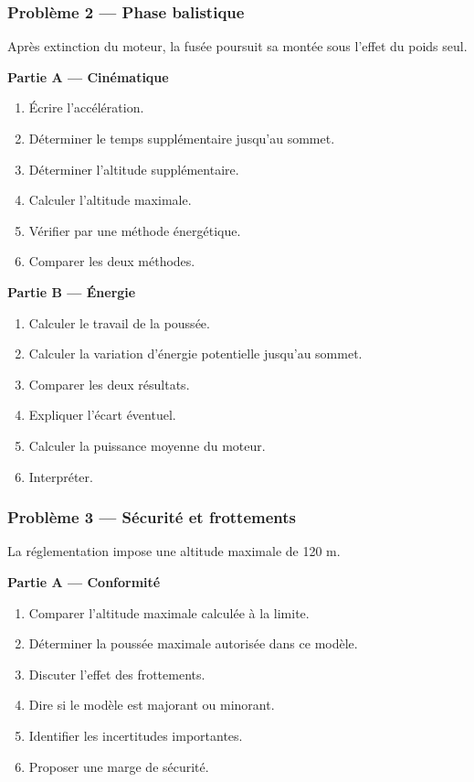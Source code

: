 \documentclass[11pt,a4paper]{article}
\begin{document}
\begin{difficile}
\subsubsection*{Problème 2 — Phase balistique}

Après extinction du moteur, la fusée poursuit sa montée sous l'effet du poids seul.

\textbf{Partie A — Cinématique}
\begin{enumerate}
  \item Écrire l'accélération.
  \item Déterminer le temps supplémentaire jusqu'au sommet.
  \item Déterminer l'altitude supplémentaire.
  \item Calculer l'altitude maximale.
  \item Vérifier par une méthode énergétique.
  \item Comparer les deux méthodes.
\end{enumerate}

\textbf{Partie B — Énergie}
\begin{enumerate}
  \item Calculer le travail de la poussée.
  \item Calculer la variation d'énergie potentielle jusqu'au sommet.
  \item Comparer les deux résultats.
  \item Expliquer l'écart éventuel.
  \item Calculer la puissance moyenne du moteur.
  \item Interpréter.
\end{enumerate}

\subsubsection*{Problème 3 — Sécurité et frottements}

La réglementation impose une altitude maximale de 120 m.

\textbf{Partie A — Conformité}
\begin{enumerate}
  \item Comparer l'altitude maximale calculée à la limite.
  \item Déterminer la poussée maximale autorisée dans ce modèle.
  \item Discuter l'effet des frottements.
  \item Dire si le modèle est majorant ou minorant.
  \item Identifier les incertitudes importantes.
  \item Proposer une marge de sécurité.
\end{enumerate}


\end{difficile}
\end{document}
